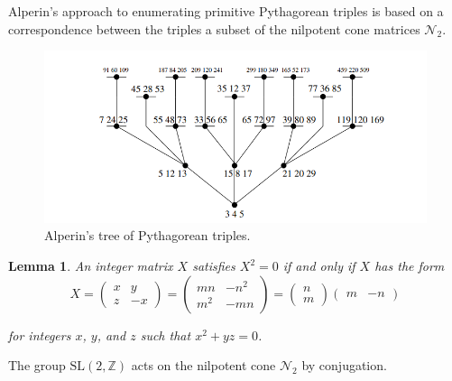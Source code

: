 \documentclass[12pt,a4paper]{amsart}
\newtheorem{lem}[thm]{Lemma}
\def\ZZ{\mathbb{Z}}
\def\sl2{\mathrm{SL}(2, \ZZ)}
\begin{document}
Alperin's approach \cite{alperin} to enumerating primitive Pythagorean triples is based on a
correspondence between the triples a subset of the nilpotent cone  matrices $\mathcal{N}_2$. 


\begin{figure}[hb]
\begin{center}
\includegraphics[scale=.5]{alperin_tree.png} 
\end{center}
\caption{Alperin's tree of Pythagorean triples.}
\label{farey diagram}
\end{figure}


\begin{lem}
 \textit{An integer matrix $X$ satisfies $X^2 = 0$ if and only if $X$ has the form}
\[
	X 
	= \begin{pmatrix} x & y \\ z & -x \end{pmatrix}
	= \begin{pmatrix}
mn & -n^2 \\
m^2 & -mn
\end{pmatrix}
	= \begin{pmatrix} n \\ m \end{pmatrix} \begin{pmatrix} m & -n 
\end{pmatrix}	
\]

\textit{for integers $x$, $y$, and $z$ such that $x^2 + yz = 0$.}
\end{lem}

The group $\sl2$ acts on the nilpotent cone $\mathcal{N}_2$ by
conjugation.
\end{document}
